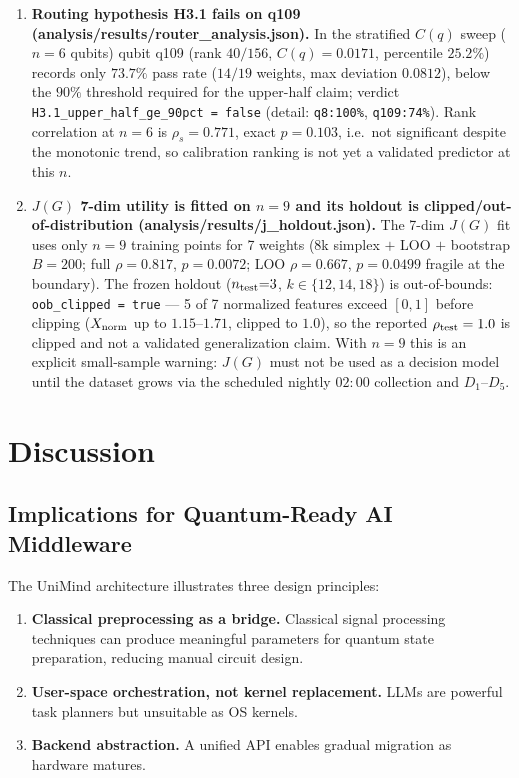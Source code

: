 ﻿\documentclass[12pt,a4paper]{article}
\begin{document}
\begin{enumerate}[leftmargin=2em]
    \item \textbf{Routing hypothesis H3.1 fails on q109 (analysis/results/router\_analysis.json).} In the stratified $C(q)$ sweep ($n{=}6$ qubits) qubit q109 (rank $40/156$, $C(q)=0.0171$, percentile $25.2\%$) records only $73.7\%$ pass rate ($14/19$ weights, max deviation $0.0812$), below the $90\%$ threshold required for the upper-half claim; verdict \texttt{H3.1\_upper\_half\_ge\_90pct = false} (detail: \texttt{q8:100\%}, \texttt{q109:74\%}). Rank correlation at $n{=}6$ is $\rho_s=0.771$, exact $p=0.103$, i.e.\ not significant despite the monotonic trend, so calibration ranking is not yet a validated predictor at this $n$.
    \item \textbf{$J(G)$ 7-dim utility is fitted on $n{=}9$ and its holdout is clipped/out-of-distribution (analysis/results/j\_holdout.json).} The 7-dim $J(G)$ fit uses only $n{=}9$ training points for 7 weights (8k simplex $+$ LOO $+$ bootstrap $B{=}200$; full $\rho=0.817$, $p=0.0072$; LOO $\rho=0.667$, $p=0.0499$ fragile at the boundary). The frozen holdout ($n_{\rm test}{=}3$, $k\in\{12,14,18\}$) is out-of-bounds: \texttt{oob\_clipped = true} --- 5 of 7 normalized features exceed $[0,1]$ before clipping ($X_{\rm norm}$ up to $1.15$--$1.71$, clipped to $1.0$), so the reported $\rho_{\rm test}=1.0$ is clipped and not a validated generalization claim. With $n{=}9$ this is an explicit small-sample warning: $J(G)$ must not be used as a decision model until the dataset grows via the scheduled nightly $02{:}00$ collection and $D_1$--$D_5$.
\end{enumerate}


\section{Discussion}\label{sec:discussion}

\subsection{Implications for Quantum-Ready AI Middleware}

The UniMind architecture illustrates three design principles:

\begin{enumerate}[leftmargin=2em]
    \item \textbf{Classical preprocessing as a bridge.} Classical signal processing techniques can produce meaningful parameters for quantum state preparation, reducing manual circuit design.
    \item \textbf{User-space orchestration, not kernel replacement.} LLMs are powerful task planners but unsuitable as OS kernels.
    \item \textbf{Backend abstraction.} A unified API enables gradual migration as hardware matures.
\end{enumerate}
\end{document}
